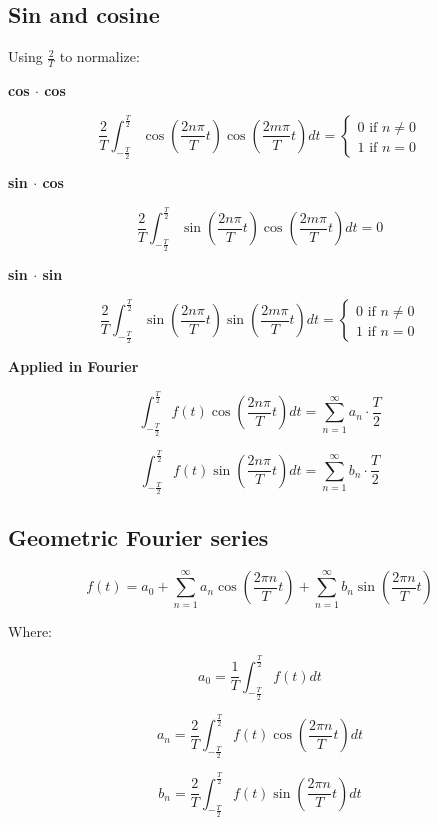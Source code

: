 \documentclass[letterpaper]{article}
\newcommand{\divline}{\noindent\makebox[\linewidth]{\rule{\textwidth}{0.4pt}}}
\begin{document}
	\begin{multicols}{2}
		\section{Sin and cosine}
		
		Using \(\frac{2}{T}\) to normalize:
		
		\textbf{cos \(\cdot\) cos}
		
		\[ \frac{2}{T} \int_{-\frac{T}{2}}^{\frac{T}{2}} \cos{( \frac{2 n \pi}{T} t )} \cos{( \frac{2 m \pi}{T} t )} dt =
		\begin{cases} 
			0 \text{ if } n \neq 0 \\
			1 \text{ if } n = 0
		\end{cases}
		\]
		
		\textbf{sin \(\cdot\) cos}
		
		\[ \frac{2}{T} \int_{-\frac{T}{2}}^{\frac{T}{2}} \sin{( \frac{2 n \pi}{T} t )} \cos{( \frac{2 m \pi}{T} t )} dt = 0\]
		
		\textbf{sin \(\cdot\) sin}
		
		\[ \frac{2}{T} \int_{-\frac{T}{2}}^{\frac{T}{2}} \sin{( \frac{2 n \pi}{T} t )} \sin{( \frac{2 m \pi}{T} t )} dt =
		\begin{cases} 
			0 \text{ if } n \neq 0 \\
			1 \text{ if } n = 0
		\end{cases}
		\]
		
		\textbf{Applied in Fourier}
		
		\[ \int_{-\frac{T}{2}}^{\frac{T}{2}} f(t) \cos{( \frac{2 n \pi}{T} t )} dt = \sum_{n = 1}^{\infty} a_{n} \cdot \frac{T}{2} \]
		
		\[ \int_{-\frac{T}{2}}^{\frac{T}{2}} f(t) \sin{( \frac{2 n \pi}{T} t )} dt = \sum_{n = 1}^{\infty} b_{n} \cdot \frac{T}{2} \]
		
	\end{multicols}
	
	\divline
	
	\begin{multicols}{2}
		
		\section{Geometric Fourier series}
		
		\[f(t) = a_{0} + \sum_{n = 1}^{\infty} a_{n} \cos{( \frac{2 \pi n}{T} t )} + \sum_{n = 1}^{\infty} b_{n} \sin{( \frac{2 \pi n}{T} t )} \]
		
		Where:
		
		\[a_{0} = \frac{1}{T} \int_{-\frac{T}{2}}^{\frac{T}{2}} f(t) dt \]
		
		\[a_{n} = \frac{2}{T} \int_{-\frac{T}{2}}^{\frac{T}{2}} f(t) \cos{( \frac{2 \pi n}{T} t )} dt \]
		
		\[b_{n} = \frac{2}{T} \int_{-\frac{T}{2}}^{\frac{T}{2}} f(t) \sin{( \frac{2 \pi n}{T} t )} dt \]
		
	\end{multicols}
	
\end{document}
